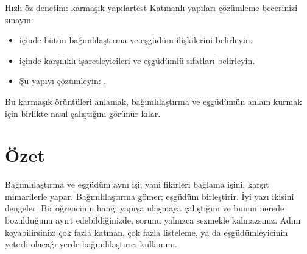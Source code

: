 \begin{tblsframedsymbol}{Hızlı öz denetim: karmaşık yapılar}{test}
Katmanlı yapıları çözümleme becerinizi sınayın:
\begin{itemize}[noitemsep, leftmargin=*]
    \item {} içinde bütün bağımlılaştırma ve eşgüdüm ilişkilerini belirleyin.
    \item {} içinde karşılıklı işaretleyicileri ve eşgüdümlü sıfatları belirleyin.
    \item Şu yapıyı çözümleyin: .
\end{itemize}
Bu karmaşık örüntüleri anlamak, bağımlılaştırma ve eşgüdümün anlam kurmak için birlikte nasıl çalıştığını görünür kılar.
\end{tblsframedsymbol}

\section{Özet}

Bağımlılaştırma ve eşgüdüm aynı işi, yani fikirleri bağlama işini, karşıt mimarilerle yapar. Bağımlılaştırma gömer; eşgüdüm birleştirir. İyi yazı ikisini dengeler. Bir öğrencinin hangi yapıya ulaşmaya çalıştığını ve bunun nerede bozulduğunu ayırt edebildiğinizde, sorunu yalnızca sezmekle kalmazsınız. Adını koyabilirsiniz: çok fazla katman, çok fazla listeleme, ya da eşgüdümleyicinin yeterli olacağı yerde bağımlılaştırıcı kullanımı.
